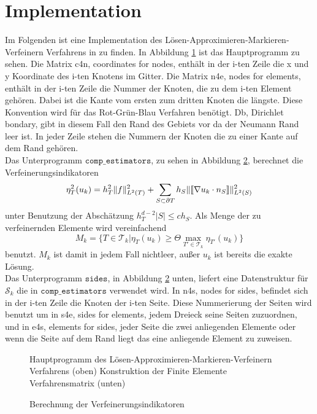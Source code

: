 \section{Implementation}
Im Folgenden ist eine Implementation des Lösen-Approximieren-Markieren-Verfeinern Verfahrens in \matlab \: zu finden. In Abbildung \ref{main} ist das Hauptprogramm zu sehen. Die Matrix c4n, coordinates for nodes, enthält in der i-ten Zeile die x und y Koordinate des i-ten Knotens im Gitter. Die Matrix n4e, nodes for elements, enthält in der i-ten Zeile die Nummer der Knoten, die zu dem i-ten Element gehören. Dabei ist die Kante vom ersten zum dritten Knoten die längste. Diese Konvention wird für das Rot-Grün-Blau Verfahren benötigt. Db, Dirichlet bondary, gibt in diesem Fall den Rand des Gebiets vor da der Neumann Rand leer ist. In jeder Zeile stehen die Nummern der Knoten die zu einer Kante auf dem Rand gehören. \\
Das Unterprogramm $\texttt{comp\_estimators}$, zu sehen in Abbildung \ref{indi}, berechnet die Verfeinerungsindikatoren
\[
\eta^2_T(u_k) = h^2_T\|f\|^2_{L^2(T)} + \sum_{S\subset\partial T} h_S\|\llbracket \nabla u_k \cdot n_S\rrbracket\|^2_{L^2(S)} 
\]
unter Benutzung der Abschätzung $h_T^{d-2}|S| \leq ch_S$.
Als Menge der zu verfeinernden Elemente wird vereinfachend
\[
M_k = \{T\in\mathscr{T}_k | \eta_T(u_k)\geq \Theta \max_{T'\in \mathscr{T}_k} \eta_{T'}(u_k)\}
\]
benutzt. $M_k$ ist damit in jedem Fall nichtleer, außer $u_k$ ist bereits die exakte Lösung. \\
Das Unterprogramm $\texttt{sides}$, in Abbildung \ref{indi} unten, liefert eine Datenstruktur für $\mathscr{S}_k$ die in $\texttt{comp\_estimators}$ verwendet wird. In n4s, nodes for sides, befindet sich in der i-ten Zeile die Knoten der i-ten Seite. Diese Nummerierung der Seiten wird benutzt um in s4e, sides for elements, jedem Dreieck seine Seiten zuzuordnen, und in e4s, elements for sides, jeder Seite die zwei anliegenden Elemente oder wenn die Seite auf dem Rand liegt das eine anliegende Element zu zuweisen.

\begin{figure}[!htbp]
	
	\caption{ \label{main}Hauptprogramm des Lösen-Approximieren-Markieren-Verfeinern Verfahrens (oben) Konstruktion der Finite Elemente Verfahrensmatrix (unten)}
\end{figure}
\begin{figure}[!htbp]
	
	\caption{\label{indi}Berechnung der Verfeinerungsindikatoren}
\end{figure}


